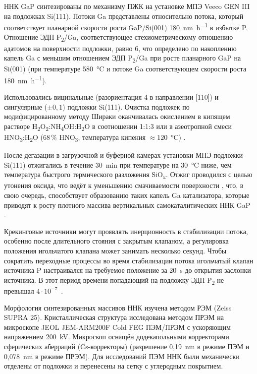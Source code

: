 ННК GaP синтезированы по механизму ПЖК на установке МПЭ Veeco GEN III на
подложках Si(111). Потоки Ga представлены относительно потока, который
соответствует планарной скорости роста GaP/Si(001)
180~\si{\nano\meter\per\hour} в избытке P. Отношение ЭДП P\textsubscript{2}/Ga,
соответствующее стехиометрическому отношению адатомов на поверхности подложки,
равно 6, что определено по накоплению капель Ga с меньшим отношением ЭДП
P\textsubscript{2}/Ga при росте планарного GaP на Si(001) (при температуре
580~\si{\degreeCelsius} и потоке Ga соответствующем скорости роста
180~\si{\nano\meter\per\hour}).

Использовались вицинальные (разориентация 4{\textdegree} в направлении [110]) и
сингулярные (\(\pm 0,1\){\textdegree}) подложки Si(111). Очистка подложек по
модифицированному методу Шираки \cite{Okumura1997, Ishizaka2019} оканчивалась
окислением в кипящем растворе
H\textsubscript{2}O\textsubscript{2}:NH\textsubscript{4}OH:H\textsubscript{2}O
в соотношении 1:1:3 или в азеотропной смеси
HNO\textsubscript{3}:H\textsubscript{2}O (68\,\% HNO\textsubscript{3},
температура кипения \(\approx 120\)~\si{\degreeCelsius}) \cite{Imamura2010}.

После дегазации в загрузочной и буферной камерах установки МПЭ подложки Si(111)
отжигались в течение 30~\si{\minute} при температуре на 30~\si{\degreeCelsius}
ниже, чем температура быстрого термического разложения SiO\textsubscript{x}.
Отжиг проводился с целью утонения оксида, что ведёт к уменьшению смачиваемости
поверхности \cite{Matteini2015}, что, в свою очередь, способствует образованию
таких капель Ga катализатора, которые приводят к росту плотного массива
вертикальных самокаталитических ННК GaP \cite{Dubrovskii2012a}.

Крекинговые источники могут проявлять инерционность в стабилизации потока,
особенно после длительного стояния с закрытым клапаном, а регулировка положения
игольчатого клапана может занимать несколько секунд. Чтобы сократить переходные
процессы во время стабилизации потока игольчатый клапан источника P
настраивался на требуемое положение за 20~\si{\second} до открытия заслонки
источника. В этот период времени попадающий на подложку ЭДП P\textsubscript{2}
не превышал \(4 \cdot 10^{-7}\)~\si{\torr}.

Морфология синтезированных массивов ННК изучена методом РЭМ (Zeiss SUPRA 25).
Кристаллическая структура исследована методом ПРЭМ на микроскопе JEOL
JEM-ARM200F Cold FEG ПЭМ/ПРЭМ с ускоряющим напряжением 200~\si{\kilo\volt}.
Микроскоп оснащён додекапольными корректорами сферических аберраций
(Cs-корректоры) (разрешение 0,19~\si{\nano\meter} в режиме ПЭМ и
0,078~\si{\nano\meter} в режиме ПРЭМ). Для исследований ПЭМ ННК были
механически отделены от подложки и перенесены на сетку с углеродным покрытием.

